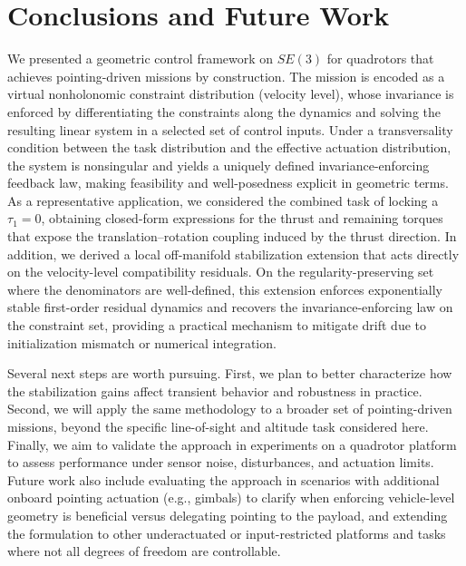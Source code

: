 \documentclass[letterpaper, 10 pt, conference]{ieeeconf}
\begin{document}
\section{Conclusions and Future Work}\label{sec:conclusions}

We presented a geometric control framework on $SE(3)$ for quadrotors that achieves pointing-driven missions by construction. The mission is encoded as a virtual nonholonomic constraint distribution (velocity level), whose invariance is enforced by differentiating the constraints along the dynamics and solving the resulting linear system in a selected set of control inputs. Under a transversality condition between the task distribution and the effective actuation distribution, the system is nonsingular and yields a uniquely defined invariance-enforcing feedback law, making feasibility and well-posedness explicit in geometric terms. As a representative application, we considered the combined task of locking a $\tau_1=0$, obtaining closed-form expressions for the thrust and remaining torques that expose the translation–rotation coupling induced by the thrust direction. In addition, we derived a local off-manifold stabilization extension that acts directly on the velocity-level compatibility residuals. On the regularity-preserving set where the denominators are well-defined, this extension enforces exponentially stable first-order residual dynamics and recovers the invariance-enforcing law on the constraint set, providing a practical mechanism to mitigate drift due to initialization mismatch or numerical integration.

Several next steps are worth pursuing. First, we plan to better characterize how the stabilization gains affect transient behavior and robustness in practice. Second, we will apply the same methodology to a broader set of pointing-driven missions, beyond the specific line-of-sight and altitude task considered here. Finally, we aim to validate the approach in experiments on a quadrotor platform to assess performance under sensor noise, disturbances, and actuation limits. Future work also include evaluating the approach in scenarios with additional onboard pointing actuation (e.g., gimbals) to clarify when enforcing vehicle-level geometry is beneficial versus delegating pointing to the payload, and extending the formulation to other underactuated or input-restricted platforms and tasks where not all degrees of freedom are controllable.




\end{document}
